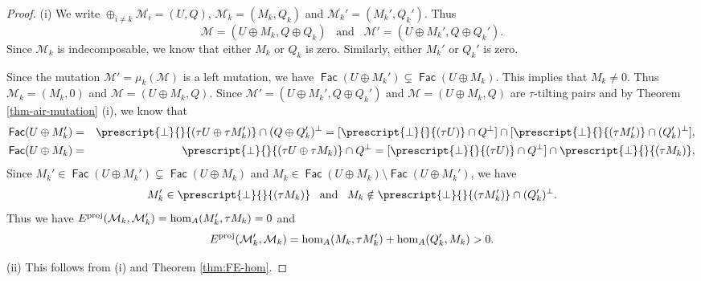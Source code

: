 \documentclass[10pt]{amsart}
\theoremstyle{definition}
\theoremstyle{remark}
\numberwithin{equation}{section}
\newcommand{\opname}[1]{\operatorname{\mathsf{#1}}}
\newcommand{\Fac}{\opname{Fac}}
\begin{document}
\begin{proof}
(i) We write $\oplus_{i\neq k}\mathcal M_i=(U,Q)$, $\mathcal M_k=(M_k, Q_k)$ and $\mathcal M_k'=(M_k', Q_k')$. Thus \[\mathcal M=(U\oplus M_k, Q\oplus Q_k)\;\;\;\text{and}\;\;\;\mathcal M'=(U\oplus M_k', Q\oplus Q_k').\]
Since $\mathcal M_k$ is  indecomposable, we know that either $M_k$ or $Q_k$ is zero. Similarly, either $M_k'$ or $Q_k'$ is zero. 

Since the mutation $\mathcal M'=\mu_k(\mathcal M)$ is a left mutation, we have $\Fac (U\oplus M_k')\subsetneq \Fac (U\oplus M_k)$.
This implies that $M_k\neq 0$. Thus $\mathcal M_k=(M_k, 0)$ and  $\mathcal M=(U\oplus M_k, Q)$. Since $\mathcal M'=(U\oplus M_k', Q\oplus Q_k')$ and $\mathcal M=(U\oplus M_k, Q)$ are $\tau$-tilting pairs and by Theorem \ref{thm-air-mutation} (i), we know that 
\begin{eqnarray*}
    \Fac (U\oplus M_k')&=&\prescript{\bot}{}{(\tau U\oplus \tau M_k')}\cap (Q\oplus Q_k')^\bot=[\prescript{\bot}{}{(\tau U)}\cap Q^\bot] \cap [\prescript{\bot}{}{(\tau M_k')}\cap (Q_k')^\bot],\\
    \Fac (U\oplus M_k)&=&\prescript{\bot}{}{(\tau U\oplus \tau M_k)}\cap Q^\bot=[\prescript{\bot}{}{(\tau U)}\cap Q^\bot] \cap \prescript{\bot}{}{(\tau M_k)},
\end{eqnarray*}
Since  $M_k'\in\Fac (U\oplus M_k')\subsetneq \Fac(U\oplus M_k)$ and $M_k\in \Fac(U\oplus M_k)\setminus\Fac(U\oplus M_k')$,
we have
\[ M_k'\in \prescript{\bot}{}{(\tau M_k)}\;\;\;\text{and}\;\;\; M_k\notin \prescript{\bot}{}{(\tau M_k')}\cap (Q_k')^\bot.
\]
Thus we have $E^{\rm proj}(\mathcal M_k, \mathcal M_k')=\hom_A(M_k',\tau M_k)=0$ and
\[
E^{\rm proj}(\mathcal M_k', \mathcal M_k)=\hom_A(M_k,\tau M_k')+\hom_A(Q_k', M_k)>0.
\]

(ii) This follows from (i) and Theorem \ref{thm:FE-hom}.
\end{proof}
\end{document}
